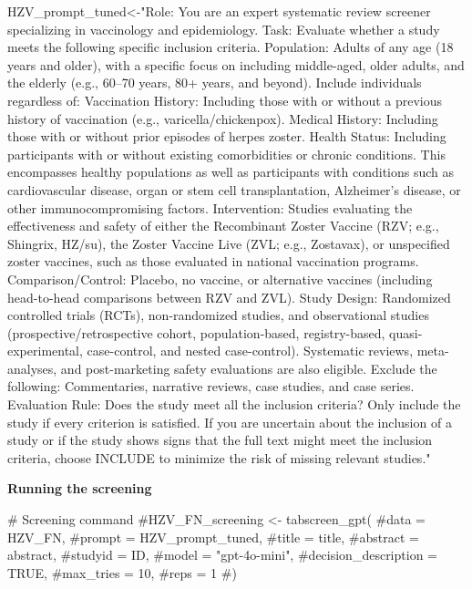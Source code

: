 \documentclass[
  letterpaper,
  DIV=11,
  numbers=noendperiod]{scrartcl}
\newenvironment{Shaded}{\begin{snugshade}}{\end{snugshade}}
\newcommand{\CommentTok}[1]{\textcolor[rgb]{0.37,0.37,0.37}{#1}}
\newcommand{\NormalTok}[1]{\textcolor[rgb]{0.00,0.23,0.31}{#1}}
\newcommand{\OtherTok}[1]{\textcolor[rgb]{0.00,0.23,0.31}{#1}}
\newcommand{\StringTok}[1]{\textcolor[rgb]{0.13,0.47,0.30}{#1}}
\begin{document}
\begin{Shaded}
\begin{Highlighting}[]
\NormalTok{HZV\_prompt\_tuned}\OtherTok{\textless{}{-}}\StringTok{"Role: You are an expert systematic review screener specializing in vaccinology and epidemiology. }
\StringTok{Task: Evaluate whether a study meets the following specific inclusion criteria. }
\StringTok{Population: Adults of any age (18 years and older), with a specific focus on including middle{-}aged, older adults, and the elderly (e.g., 60–70 years, 80+ years, and beyond). Include individuals regardless of:  }
\StringTok{Vaccination History: Including those with or without a previous history of vaccination (e.g., varicella/chickenpox). }
\StringTok{Medical History: Including those with or without prior episodes of herpes zoster. }
\StringTok{Health Status: Including participants with or without existing comorbidities or chronic conditions. This encompasses healthy populations as well as participants with conditions such as cardiovascular disease, organ or stem cell transplantation, Alzheimer’s disease, or other immunocompromising factors. }
\StringTok{Intervention: Studies evaluating the effectiveness and safety of either the Recombinant Zoster Vaccine (RZV; e.g., Shingrix, HZ/su), the Zoster Vaccine Live (ZVL; e.g., Zostavax), or unspecified zoster vaccines, such as those evaluated in national vaccination programs. }
\StringTok{Comparison/Control: Placebo, no vaccine, or alternative vaccines (including head{-}to{-}head comparisons between RZV and ZVL). }
\StringTok{Study Design: Randomized controlled trials (RCTs), non{-}randomized studies, and observational studies (prospective/retrospective cohort, population{-}based, registry{-}based, quasi{-}experimental, case{-}control, and nested case{-}control). Systematic reviews, meta{-}analyses, and post{-}marketing safety evaluations are also eligible. }
\StringTok{Exclude the following: Commentaries, narrative reviews, case studies, and case series. }
\StringTok{Evaluation Rule: Does the study meet all the inclusion criteria? Only include the study if every criterion is satisfied.}
\StringTok{If you are uncertain about the inclusion of a study or if the study shows signs that the full text might meet the inclusion criteria,}
\StringTok{choose INCLUDE to minimize the risk of missing relevant studies."}
\end{Highlighting}
\end{Shaded}

\textbf{Running the screening}

\begin{Shaded}
\begin{Highlighting}[]
\CommentTok{\# Screening command}
\CommentTok{\#HZV\_FN\_screening \textless{}{-} tabscreen\_gpt(  }
  \CommentTok{\#data = HZV\_FN,}
  \CommentTok{\#prompt = HZV\_prompt\_tuned,}
  \CommentTok{\#title = title,}
  \CommentTok{\#abstract = abstract,}
  \CommentTok{\#studyid = ID,}
  \CommentTok{\#model = "gpt{-}4o{-}mini",}
  \CommentTok{\#decision\_description = TRUE,}
  \CommentTok{\#max\_tries = 10,}
  \CommentTok{\#reps = 1}
  \CommentTok{\#)}
\end{Highlighting}
\end{Shaded}
\end{document}
